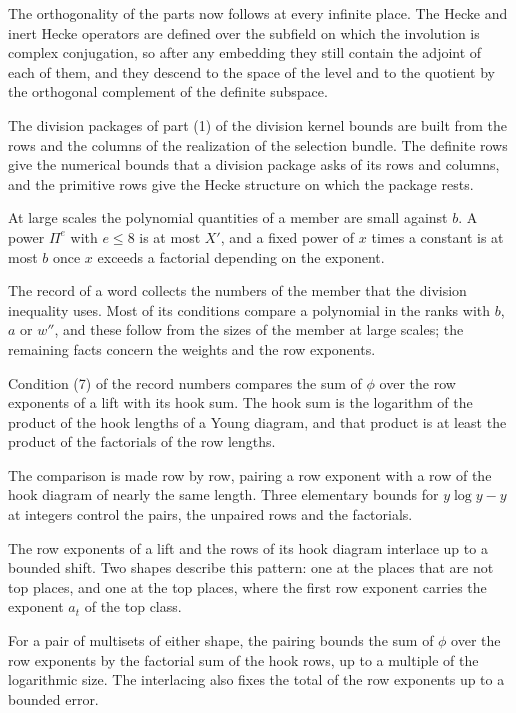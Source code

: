 The orthogonality of the parts now follows at every infinite place. The Hecke and inert Hecke
operators are defined over the subfield on which the involution is complex conjugation, so after
any embedding they still contain the adjoint of each of them, and they descend to the space of
the level and to the quotient by the orthogonal complement of the definite subspace.

The division packages of part (1) of the division kernel bounds are built
from the rows and the columns of the realization of the selection bundle.
The definite rows give the numerical bounds that a division package asks of
its rows and columns, and the primitive rows give the Hecke structure on which
the package rests.

At large scales the polynomial quantities of a member are small against $b$.
A power $\Pi^e$ with $e\le8$ is at most $X'$, and a fixed power of $x$ times a
constant is at most $b$ once $x$ exceeds a factorial depending on the exponent.

The record of a word collects the numbers of the member that the division
inequality uses. Most of its conditions compare a polynomial in the ranks with
$b$, $a$ or $w''$, and these follow from the sizes of the member at large
scales; the remaining facts concern the weights and the row exponents.

Condition (7) of the record numbers compares the sum of $\phi$ over the row
exponents of a lift with its hook sum. The hook sum is the logarithm of the
product of the hook lengths of a Young diagram, and that product is at least
the product of the factorials of the row lengths.

The comparison is made row by row, pairing a row exponent with a row of the
hook diagram of nearly the same length. Three elementary bounds for
$y\log y-y$ at integers control the pairs, the unpaired rows and the factorials.

The row exponents of a lift and the rows of its hook diagram interlace up to a
bounded shift. Two shapes describe this pattern: one at the places that are not
top places, and one at the top places, where the first row exponent carries the
exponent $a_t$ of the top class.

For a pair of multisets of either shape, the pairing bounds the sum of $\phi$
over the row exponents by the factorial sum of the hook rows, up to a multiple
of the logarithmic size. The interlacing also fixes the total of the row
exponents up to a bounded error.

